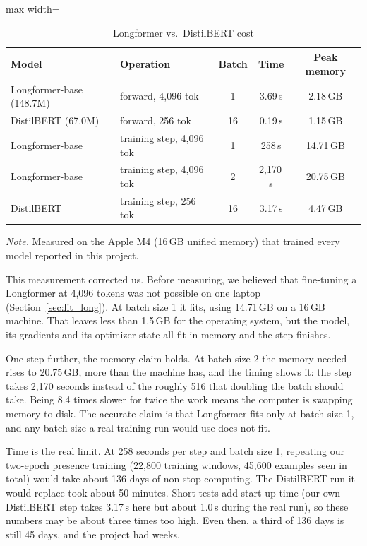 \begin{table}[ht]
\centering
\caption{Longformer vs.\ DistilBERT cost}
\label{tab:lfbench}
\small
\begin{adjustbox}{max width=\textwidth}
\begin{tabular}{llccc}
\toprule
\textbf{Model} & \textbf{Operation} & \textbf{Batch} & \textbf{Time} & \textbf{Peak memory}\\
\midrule
Longformer-base (148.7M) & forward, 4{,}096 tok & 1 & 3.69\,s & 2.18\,GB\\
DistilBERT (67.0M)       & forward, 256 tok     & 16 & 0.19\,s & 1.15\,GB\\
\addlinespace
Longformer-base & training step, 4{,}096 tok & 1 & 258\,s & 14.71\,GB\\
Longformer-base & training step, 4{,}096 tok & 2 & 2{,}170\,s & 20.75\,GB\\
DistilBERT      & training step, 256 tok     & 16 & 3.17\,s & 4.47\,GB\\
\bottomrule
\end{tabular}
\end{adjustbox}

{\footnotesize\singlespacing \emph{Note.} Measured on the Apple M4 (16\,GB unified memory) that trained every model reported in this project.\par}
\end{table}

This measurement corrected us. Before measuring, we believed that fine-tuning a Longformer at 4{,}096 tokens was not possible on one laptop (Section~\ref{sec:lit_long}). At batch size 1 it fits, using 14.71\,GB on a 16\,GB machine. That leaves less than 1.5\,GB for the operating system, but the model, its gradients and its optimizer state all fit in memory and the step finishes.

One step further, the memory claim holds. At batch size 2 the memory needed rises to 20.75\,GB, more than the machine has, and the timing shows it: the step takes 2{,}170 seconds instead of the roughly 516 that doubling the batch should take. Being 8.4 times slower for twice the work means the computer is swapping memory to disk. The accurate claim is that Longformer fits only at batch size 1, and any batch size a real training run would use does not fit.

Time is the real limit. At 258 seconds per step and batch size 1, repeating our two-epoch presence training (22{,}800 training windows, 45{,}600 examples seen in total) would take about 136 days of non-stop computing. The DistilBERT run it would replace took about 50 minutes. Short tests add start-up time (our own DistilBERT step takes 3.17\,s here but about 1.0\,s during the real run), so these numbers may be about three times too high. Even then, a third of 136 days is still 45 days, and the project had weeks.


